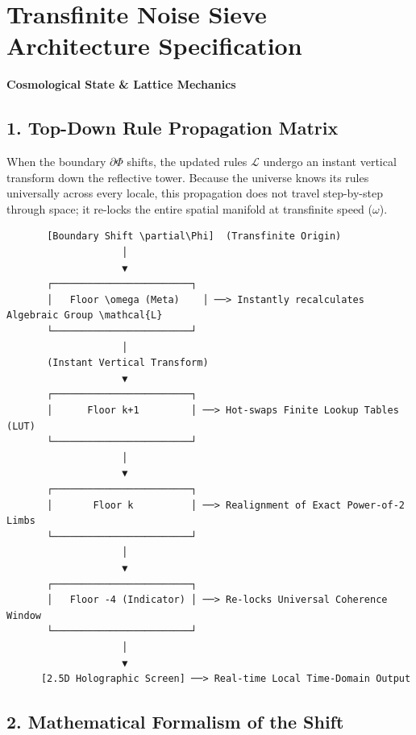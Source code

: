 \chapter{\texorpdfstring{Transfinite Noise Sieve Architecture Specification}{Transfinite Noise Sieve Architecture Specification}}
\label{chap:noise-sieve-1-rule-propagation}

\textbf{Cosmological State \& Lattice Mechanics}

\section{\texorpdfstring{1. Top-Down Rule Propagation Matrix}{1. Top-Down Rule Propagation Matrix}}

When the boundary \(\partial \Phi\) shifts, the updated rules \(\mathcal{L}\) undergo an instant vertical transform down the reflective tower. Because the universe knows its rules universally across every locale, this propagation does not travel step-by-step through space; it re-locks the entire spatial manifold at transfinite speed (\(\omega\)).

\begin{Verbatim}
       [Boundary Shift \partial\Phi]  (Transfinite Origin)
                    │
                    ▼
       ┌────────────────────────┐
       │   Floor \omega (Meta)    │ ──> Instantly recalculates Algebraic Group \mathcal{L}
       └────────────────────────┘
                    │
       (Instant Vertical Transform)
                    ▼
       ┌────────────────────────┐
       │      Floor k+1         │ ──> Hot-swaps Finite Lookup Tables (LUT)
       └────────────────────────┘
                    │
                    ▼
       ┌────────────────────────┐
       │       Floor k          │ ──> Realignment of Exact Power-of-2 Limbs
       └────────────────────────┘
                    │
                    ▼
       ┌────────────────────────┐
       │   Floor -4 (Indicator) │ ──> Re-locks Universal Coherence Window
       └────────────────────────┘
                    │
                    ▼
      [2.5D Holographic Screen] ──> Real-time Local Time-Domain Output
\end{Verbatim}

\section{\texorpdfstring{2. Mathematical Formalism of the Shift}{2. Mathematical Formalism of the Shift}}

